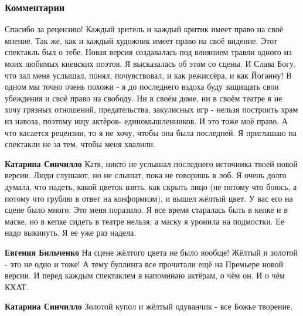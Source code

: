  
 
 
 
 
\subsubsection{Комментарии}

\begin{itemize}

Спасибо за рецензию! Каждый зритель и каждый критик имеет право на своё мнение.
Так же, как и каждый художник имеет право на своё видение. Этот спектакль был о
тебе. Новая версия создавалась под влиянием травли одного из моих любимых
киевских поэтов. Я высказалась об этом со сцены. И Слава Богу, что зал меня
услышал, понял, почувствовал, и как режиссёра, и как Йоганну! В одном мы точно
очень похожи - я до последнего вздоха буду защищать свои убеждения и своё право
на свободу. Ни в своём доме, ни в своём театре я не хочу грязных отношений,
предательства, закулисных игр - нельзя построить храм из навоза, поэтому ищу
актёров- единомышленников. И это тоже моё право. А что касается рецензии, то я
не хочу, чтобы она была последней. Я приглашаю на спектакли не за тем, чтобы
меня хвалили.

\begin{itemize}

\textbf{Катарина Синчилло} Катя, никто не услышал последнего источника твоей
новой версии. Люди слушают, но не слышат, пока не говоришь в лоб. Я очень долго
думала, что надеть, какой цветок взять, как скрыть лицо (не потому что боюсь, а
потому что грублю в ответ на конформизм), и вышел жёлтый цвет. У вас его на
сцене было много. Это меня поразило. Я все время старалась быть в кепке и в
маске, но в кепке сидеть в театре нельзя, а маску я уронила на подмостки. Ее
надо выкинуть. Я ее уже раз надела.

\textbf{Евгения Бильченко} На сцене жёлтого цвета не было вообще! Жёлтый и
золотой - это не одно и тоже! А тему буллинга все прочитали ещё на Премьере
новой версии. И перед каждым спектаклем я напоминаю актёрам, о чём он. И о чём
КХАТ.

\textbf{Катарина Синчилло} Золотой купол и жёлтый одуванчик - все Божье творение.


\end{itemize}
\end{itemize}

